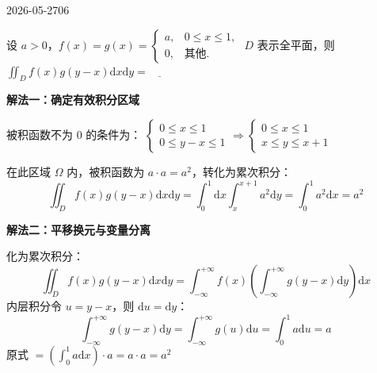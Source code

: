 \begin{mistake}{2026-05-27}{06}

\begin{problemcontent}
设 \(a>0\)，\(f(x)=g(x)=\begin{cases} a, & 0 \leqslant x \leqslant 1, \\ 0, & \text{其他.} \end{cases}\) \(D\) 表示全平面，则 \(\iint_D f(x)g(y-x) \mathrm{d}x\mathrm{d}y = \underline{\quad\quad}\)
\end{problemcontent}

\begin{solutioncontent}
\textbf{解法一：确定有效积分区域}

被积函数不为 0 的条件为：
\(\begin{cases} 0 \leqslant x \leqslant 1 \\ 0 \leqslant y-x \leqslant 1 \end{cases} \Rightarrow \begin{cases} 0 \leqslant x \leqslant 1 \\ x \leqslant y \leqslant x+1 \end{cases}\)

在此区域 \(\Omega\) 内，被积函数为 \(a \cdot a = a^2\)，转化为累次积分：
\[\iint_D f(x)g(y-x) \mathrm{d}x\mathrm{d}y = \int_0^1 \mathrm{d}x \int_x^{x+1} a^2 \mathrm{d}y = \int_0^1 a^2 \mathrm{d}x = a^2\]

\textbf{解法二：平移换元与变量分离}

化为累次积分：
\[\iint_D f(x)g(y-x) \mathrm{d}x\mathrm{d}y = \int_{-\infty}^{+\infty} f(x) \left( \int_{-\infty}^{+\infty} g(y-x) \mathrm{d}y \right) \mathrm{d}x\]
内层积分令 \(u = y-x\)，则 \(\mathrm{d}u = \mathrm{d}y\)：
\[\int_{-\infty}^{+\infty} g(y-x) \mathrm{d}y = \int_{-\infty}^{+\infty} g(u) \mathrm{d}u = \int_0^1 a \mathrm{d}u = a\]
原式 \(= \left(\int_0^1 a \mathrm{d}x\right) \cdot a = a \cdot a = a^2\)
\end{solutioncontent}


\end{mistake}
